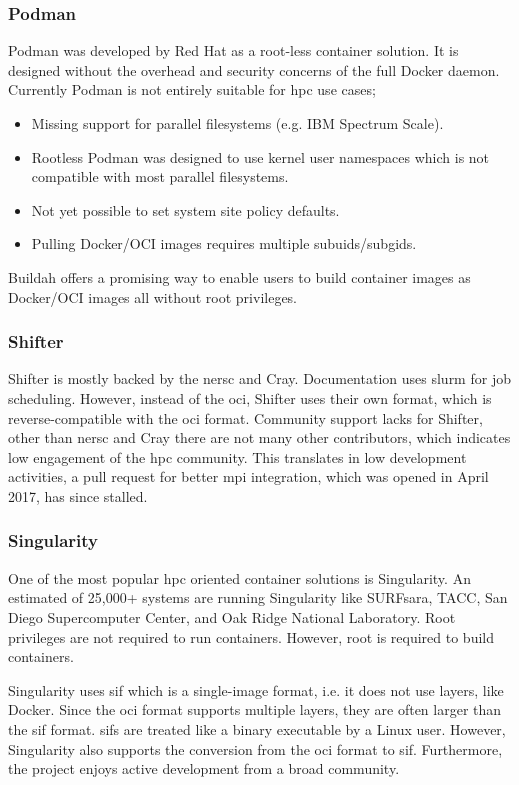 \documentclass[conference]{IEEEtran}
\begin{document}
\subsubsection{Podman}
Podman was developed by Red Hat as a root-less container solution. It is designed without the overhead and security concerns of the full Docker daemon. Currently Podman is not entirely suitable for \gls{hpc} use cases;
\begin{itemize}
    \item Missing support for parallel filesystems (e.g. IBM Spectrum Scale).
    \item Rootless Podman was designed to use kernel user namespaces which is not compatible with most parallel filesystems.
    \item Not yet possible to set system site policy defaults.
    \item Pulling Docker/OCI images requires multiple subuids/subgids.
\end{itemize}
Buildah offers a promising way to enable users to build container images as Docker/OCI images all without root privileges.


\subsubsection{Shifter}
Shifter is mostly backed by the \gls{nersc} and Cray. Documentation uses \gls{slurm} for job scheduling. However, instead of the \gls{oci}, Shifter uses their own format, which is reverse-compatible with the \gls{oci} format. Community support lacks for Shifter, other than \gls{nersc} and Cray there are not many other contributors, which indicates low engagement of the \gls{hpc} community. This translates in low development activities, a pull request for better \gls{mpi} integration, which was opened in April 2017, has since stalled.


\subsubsection{Singularity}
One of the most popular \gls{hpc} oriented container solutions is Singularity. An estimated of 25,000+ systems are running Singularity like SURFsara, TACC, San Diego Supercomputer Center, and Oak Ridge National Laboratory. Root privileges are not required to run containers. However, root is required to build containers.

Singularity uses \gls{sif} which is a single-image format, i.e. it does not use layers, like Docker. Since the \gls{oci} format supports multiple layers, they are often larger than the \gls{sif} format. \glspl{sif} are treated like a binary executable by a Linux user. However, Singularity also supports the conversion from the \gls{oci} format to \gls{sif}. Furthermore, the project enjoys active development from a broad community.
\end{document}

